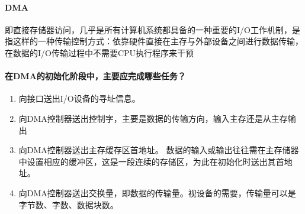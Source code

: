 \documentclass[a4paper, 12pt, oneside]{ctexart}
\begin{document}
	\paragraph{DMA}即直接存储器访问，几乎是所有计算机系统都具备的一种重要的I/O工作机制，是指这样的一种传输控制方式：依靠硬件直接在主存与外部设备之间进行数据传输，在数据的I/O传输过程中不需要CPU执行程序来干预
	\paragraph{在DMA的初始化阶段中，主要应完成哪些任务？}
	\begin{enumerate}
		\item 向接口送出I/O设备的寻址信息。
		\item 向DMA控制器送出控制字，主要是数据的传输方向，输入主存还是从主存输出
		\item 向DMA控制器送出主存缓存区首地址。 数据的输入或输出往往需在主存储器中设置相应的缓冲区，这是一段连续的存储区，为此在初始化时送出其首地址。
		\item 向DMA控制器送出交换量，即数据的传输量。视设备的需要，传输量可以是字节数、字数、数据块数。
	\end{enumerate}
	
\end{document}
